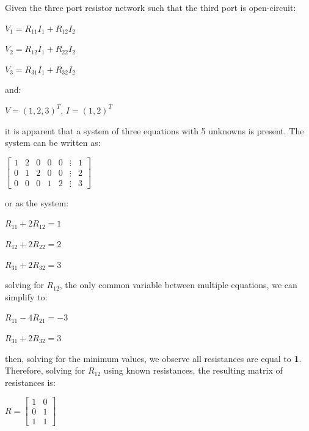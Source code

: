 \documentclass{report}
\begin{document}
	Given the three port resistor network such that the third port is open-circuit:
	
	\textit{}
	
	$V_{1} = R_{11}I_{1} + R_{12}I_{2}$
	
	$V_{2} = R_{12}I_{1} + R_{22}I_{2}$
	
	$V_{3} = R_{31}I_{1} + R_{32}I_{2}$
	
	\textit{}
	
	\noindent and:
	
	\textit{}
	
	$V = (1, 2, 3)^{T}$, $I = (1, 2)^{T}$
	
	\textit{}
	
	\noindent it is apparent that a system of three equations with 5 unknowns is present. The system can be written as:
	
	\textit{}
	
	$\begin{bmatrix}
		1 & 2 & 0 & 0 & 0 & \vdots & 1 \\
		0 & 1 & 2 & 0 & 0 & \vdots & 2 \\
		0 & 0 & 0 & 1 & 2 & \vdots & 3
	\end{bmatrix}$

	\textit{}
	
	\noindent or as the system:
	
	\textit{}
	
	$R_{11} + 2R_{12} = 1$
	
	$R_{12} + 2R_{22} = 2$
	
	$R_{31} + 2R_{32} = 3$
	
	\textit{}
	
	\noindent solving for $R_{12}$, the only common variable between multiple equations, we can simplify to:
	
	\textit{}
	
	$R_{11} - 4R_{21} = -3$
	
	$R_{31} + 2R_{32} = 3$
	
	\textit{}
	
	\noindent then, solving for the minimum values, we observe all resistances are equal to \textbf{1}. Therefore, solving for $R_{12}$ using known resistances, the resulting matrix of resistances is:
	
	\textit{}
	
	$R = \begin{bmatrix}
		1 & 0 \\
		0 & 1 \\
		1 & 1
	\end{bmatrix}$
\end{document}
